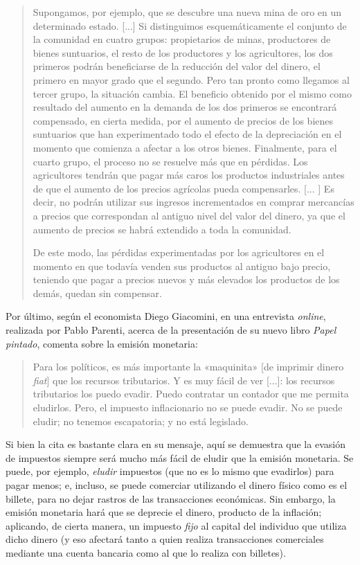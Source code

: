 \documentclass[12pt,a4paper,twoside]{book}
\begin{document}
\begin{quotation}
Supongamos, por ejemplo, que se descubre una nueva mina de oro en un determinado estado. [...] Si distinguimos esquemáticamente el conjunto de la comunidad en cuatro grupos: propietarios de minas, productores de bienes suntuarios, el resto de los productores y los agricultores, los dos primeros podrán beneficiarse de la reducción del valor del dinero, el primero en mayor grado que el segundo. Pero tan pronto como llegamos al tercer grupo, la situación cambia. El beneficio obtenido por el mismo como resultado del aumento en la demanda de los dos primeros se encontrará compensado, en cierta medida, por el aumento de precios de los bienes suntuarios que han experimentado todo el efecto de la depreciación en el momento que comienza a afectar a los otros bienes. Finalmente, para el cuarto grupo, el proceso no se resuelve más que en pérdidas. Los agricultores tendrán que pagar más caros los productos industriales antes de que el aumento de los precios agrícolas pueda compensarles. [... ] Es decir, no podrán utilizar sus ingresos incrementados en comprar mercancías a precios que correspondan al antiguo nivel del valor del dinero, ya que el aumento de precios se habrá extendido a toda la comunidad.

De este modo, las pérdidas experimentadas por los agricultores en el momento en que todavía venden sus productos al antiguo bajo precio, teniendo que pagar a precios nuevos y más elevados los productos de los demás, quedan sin compensar. \cite[págs. 182-185]{mises:teodinero}
\end{quotation}

Por último, según el economista Diego Giacomini, en una entrevista \textit{online}, realizada por Pablo Parenti, acerca de la presentación de su nuevo libro \textit{Papel pintado}, comenta sobre la emisión monetaria:

\begin{quotation}
Para los políticos, es más importante la «maquinita» [de imprimir dinero \textit{fiat}] que los recursos tributarios. Y es muy fácil de ver [...]: los recursos tributarios los puedo evadir. Puedo contratar un contador que me permita eludirlos. Pero, el impuesto inflacionario no se puede evadir. No se puede eludir; no tenemos escapatoria; y no está legislado. \cite[CT. 00:12:16]{giacomini:emision}
\end{quotation}

Si bien la cita es bastante clara en su mensaje, aquí se demuestra que la evasión de impuestos siempre será mucho más fácil de eludir que la emisión monetaria. Se puede, por ejemplo, \textit{eludir} impuestos (que no es lo mismo que evadirlos) para pagar menos; e, incluso, se puede comerciar utilizando el dinero físico como es el billete, para no dejar rastros de las transacciones económicas. Sin embargo, la emisión monetaria hará que se deprecie el dinero, producto de la inflación; aplicando, de cierta manera, un impuesto \textit{fijo} al capital del individuo que utiliza dicho dinero (y eso afectará tanto a quien realiza transacciones comerciales mediante una cuenta bancaria como al que lo realiza con billetes).
\end{document}
